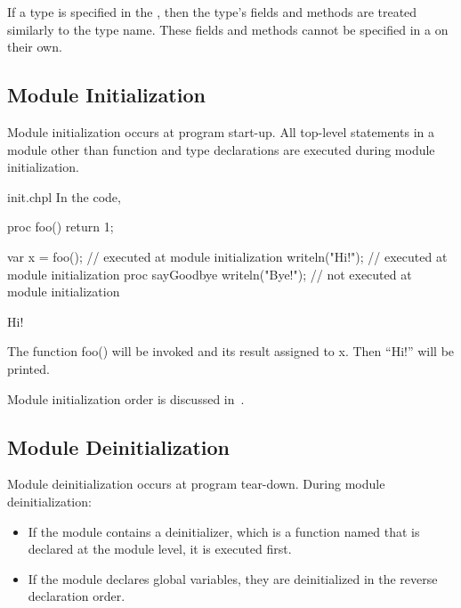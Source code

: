 If a type is specified in the , then the type's fields
and methods are treated similarly to the type name.  These fields and methods
cannot be specified in a  on their own.



\subsection{Module Initialization}
\label{Module_Initialization}

Module initialization occurs at program start-up.  All top-level
statements in a module other than function and type declarations are
executed during module initialization.

\begin{chapelexample}{init.chpl}
In the code,
\begin{chapelpre}
proc foo() {
    return 1;
}
\end{chapelpre}
\begin{chapel}
var x = foo();       // executed at module initialization
writeln("Hi!");      // executed at module initialization
proc sayGoodbye {
  writeln("Bye!");   // not executed at module initialization
}
\end{chapel}
\begin{chapeloutput}
Hi!
\end{chapeloutput}
The function foo() will be invoked and its result assigned to x.  Then
``Hi!'' will be printed.
\end{chapelexample}

Module initialization order is discussed
in~.


\subsection{Module Deinitialization}
\label{Module_Deinitialization}

Module deinitialization occurs at program tear-down.
During module deinitialization:

\begin{itemize}

\item If the module contains a deinitializer, which is a function
named  that is declared at the module level,
it is executed first.

\item If the module declares global variables, they are deinitialized
in the reverse declaration order.

\end{itemize}

